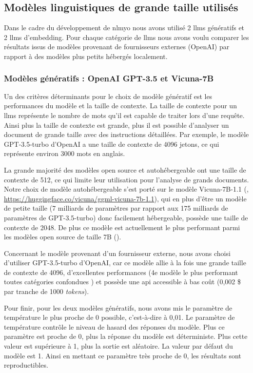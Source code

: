 \subsection{Modèles linguistiques de grande taille utilisés}
Dans le cadre du développement de \gls{nlmyo} nous avons utilisé 2 \gls{llms} génératifs et 2 \gls{llms} d'embedding. Pour chaque catégorie de \gls{llms} nous avons voulu comparer les résultats issus de modèles provenant de fournisseurs externes (OpenAI) par rapport à des modèles plus petits hébergés localement.

\subsubsection{Modèles génératifs : OpenAI GPT-3.5 et Vicuna-7B}
Un des critères déterminants pour le choix de modèle génératif est les performances du modèle et la taille de contexte. La taille de contexte pour un \gls{llms} représente le nombre de mots qu'il est capable de traiter lors d'une requête. Ainsi plus la taille de contexte est grande, plus il est possible d'analyser un document de grande taille avec des instructions détaillées. Par exemple, le modèle GPT-3.5-turbo d'OpenAI a une taille de contexte de 4096 jetons, ce qui représente environ 3000 mots en anglais. 

La grande majorité des modèles open source et autohébergeable ont une taille de contexte de 512, ce qui limite leur utilisation pour l'analyse de grands documents. Notre choix de modèle autohébergeable s'est porté sur le modèle Vicuna-7B-1.1 (\cite{chiang_vicuna_2023}, \href{https://huggingface.co/vicuna/ggml-vicuna-7b-1.1}{https://huggingface.co/vicuna/ggml-vicuna-7b-1.1}), qui en plus d'être un modèle de petite taille (7 milliards de paramètres par rapport aux 175 milliards de paramètres de GPT-3.5-turbo) donc facilement hébergeable, possède une taille de contexte de 2048. De plus ce modèle est actuellement le plus  performant parmi les modèles open source de taille 7B (\cite{hendrycks_measuring_2021}). 

Concernant le modèle provenant d'un fournisseur externe, nous avons choisi d'utiliser GPT-3.5-turbo d'OpenAI, car ce modèle allie à la fois une  grande taille de contexte de 4096, d'excellentes performances (4e modèle le plus performant toutes catégories confondues \cite{lianmin_zheng_chatbot_2023}) et possède une \gls{api} accessible à bas coût (0,002 \$ par tranche de 1000 \textit{tokens}).

Pour finir, pour les deux modèles génératifs, nous avons mis le paramètre de température le plus proche de 0 possible, c'est-à-dire à 0,01. Le paramètre de température contrôle le niveau de hasard des réponses du modèle. Plus ce paramètre est proche de 0, plus la réponse du modèle est déterministe. Plus cette valeur est supérieure à 1, plus la sortie est aléatoire. La valeur par défaut du modèle est 1. Ainsi en mettant ce paramètre très proche de 0, les résultats sont reproductibles. 

